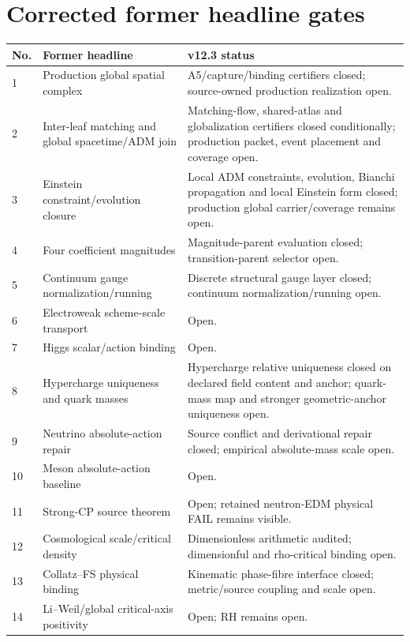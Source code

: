 \section{Corrected former headline gates}

\begin{longtable}{p{}p{}p{}}
\toprule
No. & Former headline & v12.3 status \\
\midrule
1 & Production global spatial complex &
A5/capture/binding certifiers closed; source-owned production realization open. \\
2 & Inter-leaf matching and global spacetime/ADM join &
Matching-flow, shared-atlas and globalization certifiers closed conditionally;
production packet, event placement and coverage open. \\
3 & Einstein constraint/evolution closure &
Local ADM constraints, evolution, Bianchi propagation and local Einstein form
closed; production global carrier/coverage remains open. \\
4 & Four coefficient magnitudes &
Magnitude-parent evaluation closed; transition-parent selector open. \\
5 & Continuum gauge normalization/running &
Discrete structural gauge layer closed; continuum normalization/running open. \\
6 & Electroweak scheme-scale transport &
Open. \\
7 & Higgs scalar/action binding &
Open. \\
8 & Hypercharge uniqueness and quark masses &
Hypercharge relative uniqueness closed on declared field content and anchor;
quark-mass map and stronger geometric-anchor uniqueness open. \\
9 & Neutrino absolute-action repair &
Source conflict and derivational repair closed; empirical absolute-mass scale
open. \\
10 & Meson absolute-action baseline &
Open. \\
11 & Strong-CP source theorem &
Open; retained neutron-EDM physical FAIL remains visible. \\
12 & Cosmological scale/critical density &
Dimensionless arithmetic audited; dimensionful and rho-critical binding open. \\
13 & Collatz--FS physical binding &
Kinematic phase-fibre interface closed; metric/source coupling and scale open. \\
14 & Li--Weil/global critical-axis positivity &
Open; RH remains open. \\
\bottomrule
\end{longtable}

